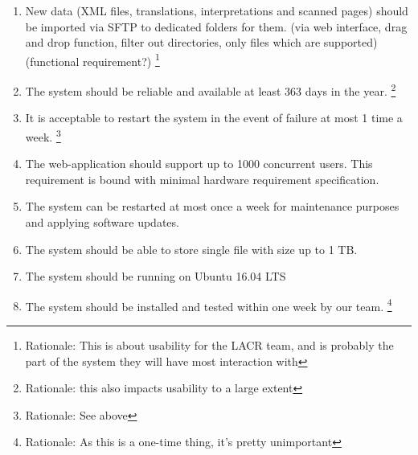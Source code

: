 \documentclass[10pt,a4paper]{report}
\begin{document}
\begin{enumerate}
            \item New data (XML files, translations, interpretations and scanned pages) should be imported via SFTP to dedicated folders for them. (via web interface, drag and drop function, filter out directories, only files which are supported) (functional requirement?)
            \footnote{Rationale: This is about usability for the LACR team, and is probably the part of the system they will have most interaction with}
            
            \item The system should be reliable and available at least 363 days in the year.
            \footnote{Rationale: this also impacts usability to a large extent}
            
            \item It is acceptable to restart the system in the event of failure at most 1 time a week.
            \footnote{Rationale: See above}
            
            \item The web-application should support up to 1000 concurrent users. This requirement is bound with minimal hardware requirement specification.
            
            \item The system can be restarted at most once a week for maintenance purposes and applying software updates.
            
            \item The system should be able to store single file with size up to 1 TB.
            
            \item The system should be running on Ubuntu 16.04 LTS
            
            \item The system should be installed and tested within one week by our team.
            \footnote{Rationale: As this is a one-time thing, it's pretty unimportant}
        \end{enumerate}
\end{document}
